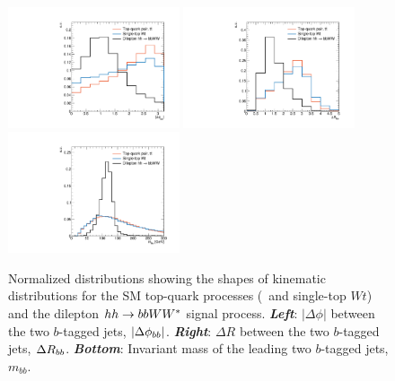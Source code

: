 \begin{figure}[!htb]
    \begin{center}
        \includegraphics[width=0.45\textwidth]{figures/search_hh/signal_pheno/shape_plots/hh_shape_plot_dphi_bb}
        \includegraphics[width=0.45\textwidth]{figures/search_hh/signal_pheno/shape_plots/hh_shape_plot_dRbb}
        \includegraphics[width=0.45\textwidth]{figures/search_hh/signal_pheno/shape_plots/hh_shape_plot_mbb}
        \caption{
            Normalized distributions showing the shapes of kinematic distributions for the SM
            top-quark processes (\ttbar~and single-top $Wt$) and the dilepton $hh \rightarrow bbWW^*$ signal process.
            \textit{\textbf{Left}}: $|\Delta \phi|$ between the two $b$-tagged jets, $|\Delta \phi_{bb}|$.
            \textit{\textbf{Right}}: $\Delta R$ between the two $b$-tagged jets, $\Delta R_{bb}$.
            \textit{\textbf{Bottom}}: Invariant mass of the leading two $b$-tagged jets, $m_{bb}$.
        }
        \label{fig:hh_kin_0}
    \end{center}
\end{figure}


